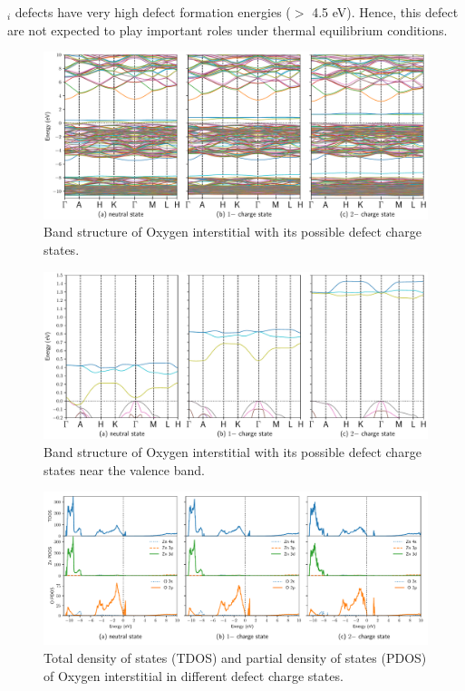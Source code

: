 $_i$ defects have very high defect formation energies ($>$ 4.5 eV). Hence, this defect are not expected to play important roles under thermal equilibrium conditions.

\begin{figure}[tbph!]
	\centering
	\includegraphics[width=1\textwidth]{"images/rnd/O_i-band"}
	\caption[Band structure of Oxygen interstitial with its possible defect charge states]{Band structure of Oxygen interstitial with its possible defect charge states. }
	\label{fig:band-O_i}
\end{figure}

\begin{figure}[tbph!]
	\centering
	\includegraphics[width=1\textwidth]{"images/rnd/O_i-bandclose"}
	\caption[Band structure of Oxygen interstitial with its possible defect charge states near the valence band]{Band structure of Oxygen interstitial with its possible defect charge states near the valence band. }
	\label{fig:bandclose-O_i}
\end{figure}

\clearpage

\begin{figure}[t!]
	\centering
	\includegraphics[width=1\textwidth]{"images/rnd/O_i-dos"}
	\caption[Total density of states (TDOS) and partial density of states (PDOS) of Oxygen interstitial in different  defect charge states]{Total density of states (TDOS) and partial density of states (PDOS) of Oxygen interstitial in different  defect charge states.}
	\label{fig:dos-O_i}
\end{figure}


